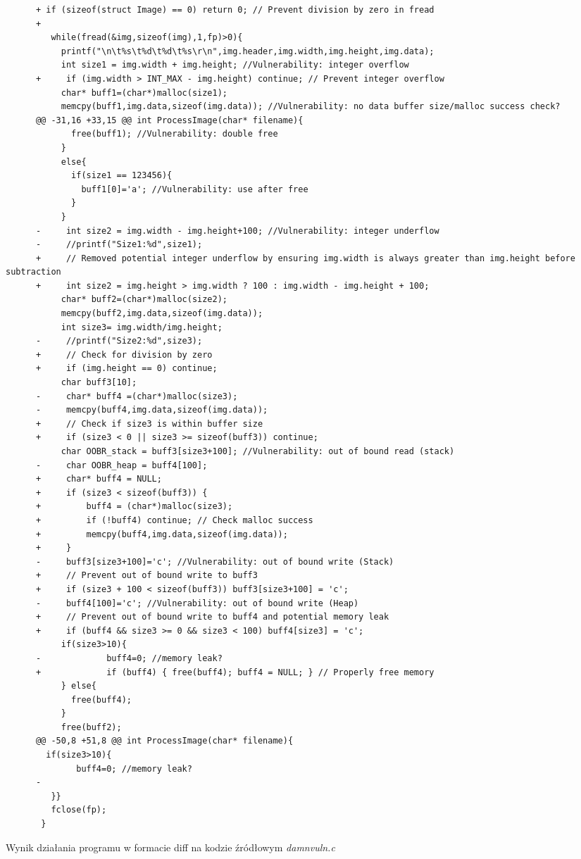 \begin{listing}[H]
\begin{verbatim}
      +	if (sizeof(struct Image) == 0) return 0; // Prevent division by zero in fread
      +
         while(fread(&img,sizeof(img),1,fp)>0){
           printf("\n\t%s\t%d\t%d\t%s\r\n",img.header,img.width,img.height,img.data);
           int size1 = img.width + img.height; //Vulnerability: integer overflow
      +		if (img.width > INT_MAX - img.height) continue; // Prevent integer overflow
           char* buff1=(char*)malloc(size1);
           memcpy(buff1,img.data,sizeof(img.data)); //Vulnerability: no data buffer size/malloc success check?
      @@ -31,16 +33,15 @@ int ProcessImage(char* filename){
             free(buff1); //Vulnerability: double free
           }
           else{
             if(size1 == 123456){
               buff1[0]='a'; //Vulnerability: use after free
             }
           }
      -		int size2 = img.width - img.height+100; //Vulnerability: integer underflow
      -		//printf("Size1:%d",size1);
      +		// Removed potential integer underflow by ensuring img.width is always greater than img.height before subtraction
      +		int size2 = img.height > img.width ? 100 : img.width - img.height + 100;
           char* buff2=(char*)malloc(size2);
           memcpy(buff2,img.data,sizeof(img.data));
           int size3= img.width/img.height;
      -		//printf("Size2:%d",size3);
      +		// Check for division by zero
      +		if (img.height == 0) continue;
           char buff3[10];
      -		char* buff4 =(char*)malloc(size3);
      -		memcpy(buff4,img.data,sizeof(img.data));
      +		// Check if size3 is within buffer size
      +		if (size3 < 0 || size3 >= sizeof(buff3)) continue;
           char OOBR_stack = buff3[size3+100]; //Vulnerability: out of bound read (stack)
      -		char OOBR_heap = buff4[100];
      +		char* buff4 = NULL;
      +		if (size3 < sizeof(buff3)) {
      +			buff4 = (char*)malloc(size3);
      +			if (!buff4) continue; // Check malloc success
      +			memcpy(buff4,img.data,sizeof(img.data));
      +		}
      -		buff3[size3+100]='c'; //Vulnerability: out of bound write (Stack)
      +		// Prevent out of bound write to buff3
      +		if (size3 + 100 < sizeof(buff3)) buff3[size3+100] = 'c';
      -		buff4[100]='c'; //Vulnerability: out of bound write (Heap)
      +		// Prevent out of bound write to buff4 and potential memory leak
      +		if (buff4 && size3 >= 0 && size3 < 100) buff4[size3] = 'c';
           if(size3>10){
      -				buff4=0; //memory leak?
      +				if (buff4) { free(buff4); buff4 = NULL; } // Properly free memory
           } else{
             free(buff4);
           }
           free(buff2);
      @@ -50,8 +51,8 @@ int ProcessImage(char* filename){
        if(size3>10){
              buff4=0; //memory leak?
      -
         }}
         fclose(fp);
       }
    \end{verbatim}
    \caption{Wynik działania programu w formacie diff na kodzie źródłowym \textit{damnvuln.c}}
    \label{lst:code2}
\end{listing}

